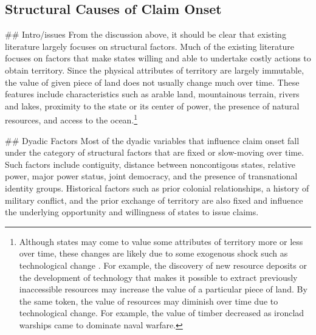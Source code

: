 \subsection{Structural Causes of Claim Onset}

## Intro/issues
From the discussion above, it should be clear that existing literature largely focuses on structural factors. Much of the existing literature focuses on factors that make states willing and able to undertake costly actions to obtain territory. Since the physical attributes of territory are largely immutable, the value of given piece of land does not usually change much over time. These features include characteristics such as arable land, mountainous terrain, rivers and lakes, proximity to the state or its center of power, the presence of natural resources, and access to the ocean.\footnote{Although states may come to value some attributes of territory more or less over time, these changes are likely due to some exogenous shock such as technological change \citep[e.g.,][]{mansbach1981}. For example, the discovery of new resource deposits or the development of technology that makes it possible to extract previously inaccessible resources may increase the value of a particular piece of land. By the same token, the value of resources may diminish over time due to technological change. For example, the value of timber decreased as ironclad warships came to dominate naval warfare.}

## Dyadic Factors
Most of the dyadic variables that influence claim onset fall under the category of structural factors that are fixed or slow-moving over time. Such factors include contiguity, distance between noncontigous states, relative power, major power status, joint democracy, and the presence of transnational identity groups. Historical factors such as prior colonial relationships, a history of military conflict, and the prior exchange of territory are also fixed and influence the underlying opportunity and willingness of states to issue claims.
